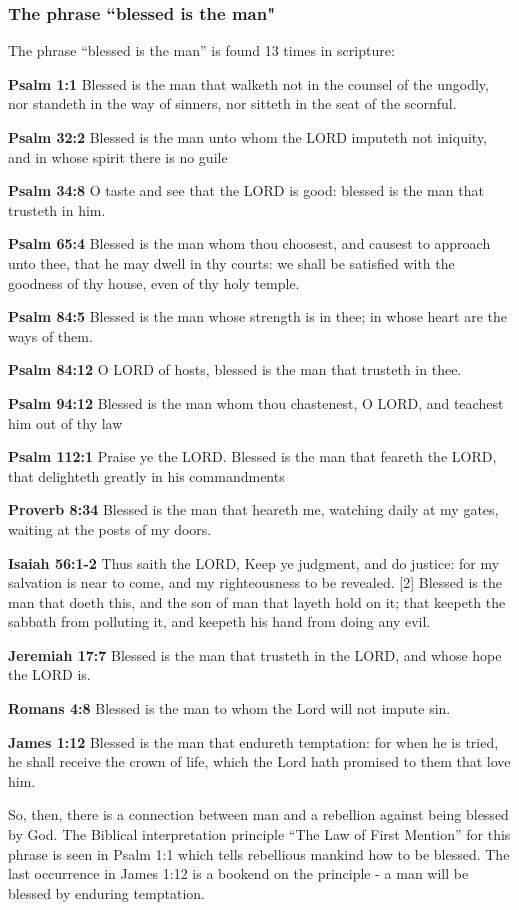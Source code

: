 \subsubsection{The phrase ``blessed is the man"}

The phrase ``blessed is the man'' is found 13 times in scripture:
\begin{compactenum}
    \item \textbf{Psalm 1:1} Blessed is the man that walketh not in the counsel of the ungodly, nor standeth in the way of sinners, nor sitteth in the seat of the scornful.
    \item \textbf{Psalm 32:2} Blessed is the man unto whom the LORD imputeth not iniquity, and in whose spirit there is no guile
    \item \textbf{Psalm 34:8} O taste and see that the LORD is good: blessed is the man that trusteth in him.
    \item \textbf{Psalm 65:4} Blessed is the man whom thou choosest, and causest to approach unto thee, that he may dwell in thy courts: we shall be satisfied with the goodness of thy house, even of thy holy temple.
    \item \textbf{Psalm 84:5}  Blessed is the man whose strength is in thee; in whose heart are the ways of them.
    \item \textbf{Psalm 84:12} O LORD of hosts, blessed is the man that trusteth in thee.
    \item \textbf{Psalm 94:12} Blessed is the man whom thou chastenest, O LORD, and teachest him out of thy law
    \item \textbf{Psalm 112:1} Praise ye the LORD. Blessed is the man that feareth the LORD, that delighteth greatly in his commandments
    \item \textbf{Proverb 8:34} Blessed is the man that heareth me, watching daily at my gates, waiting at the posts of my doors.
    \item \textbf{Isaiah  56:1-2} Thus saith the LORD, Keep ye judgment, and do justice: for my salvation is near to come, and my righteousness to be revealed. [2] Blessed is the man that doeth this, and the son of man that layeth hold on it; that keepeth the sabbath from polluting it, and keepeth his hand from doing any evil.
    \item \textbf{Jeremiah 17:7} Blessed is the man that trusteth in the LORD, and whose hope the LORD is.
    \item \textbf{Romans 4:8} Blessed is the man to whom the Lord will not impute sin.
    \item \textbf{James 1:12} Blessed is the man that endureth temptation: for when he is tried, he shall receive the crown of life, which the Lord hath promised to them that love him.\\
\end{compactenum}

\noindent So, then, there is a connection between man and a rebellion against being blessed by God. The Biblical interpretation principle ``The Law of First Mention'' for this phrase is seen in Psalm 1:1 which tells rebellious mankind how to be blessed. The last occurrence in James 1:12 is a bookend on the principle - a man will be blessed by enduring temptation.
